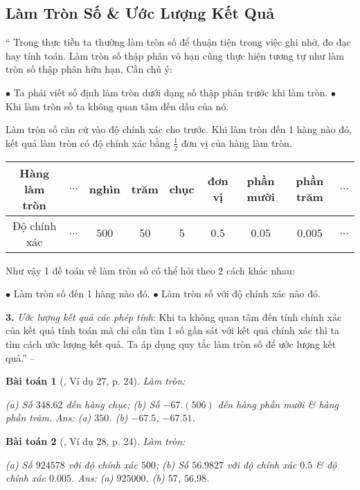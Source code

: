 \documentclass{article}
\newtheorem{baitoan}{Bài toán}
\begin{document}
\subsection{Làm Tròn Số \& Ước Lượng Kết Quả}
``
	 Trong thực tiễn ta thường làm tròn số để thuận tiện trong việc ghi nhớ, đo đạc hay tính toán. Làm tròn số thập phân vô hạn cũng thực hiện tương tự như làm tròn số thập phân hữu hạn. Cần chú ý:
	
		$\bullet$ Ta phải viết số định làm tròn dưới dạng số thập phân trước khi làm tròn.
		$\bullet$ Khi làm tròn số ta không quan tâm đến dấu của nó.
	
	 Làm tròn số căn cứ vào độ chính xác cho trước. Khi làm tròn đến 1 hàng nào đó, kết quả làm tròn có độ chính xác bằng $\frac{1}{2}$ đơn vị của hàng làm tròn.

\begin{table}[H]
	\centering
	\begin{tabular}{|c|c|c|c|c|c|c|c|c|}
		\hline
		Hàng làm tròn & $\ldots$ & nghìn & trăm & chục & đơn vị & phần mười & phần trăm & $\ldots$ \\
		\hline
		Độ chính xác & $\ldots$ & $500$ & $50$ & $5$ & $0.5$ & $0.05$ & $0.005$ & $\ldots$ \\
		\hline
	\end{tabular}
\end{table}
Như vậy 1 đề toán về làm tròn số có thể hỏi theo 2 cách khác nhau:

	$\bullet$ Làm tròn số đến 1 hàng nào đó.
	$\bullet$ Làm tròn số với độ chính xác nào đó.

\textbf{3.} \textit{Ước lượng kết quả các phép tính}: Khi ta không quan tâm đến tính chính xác của kết quả tính toán mà chỉ cần tìm 1 số gần sát với kết quả chính xác thì ta tìm cách ước lượng kết quả. Ta áp dụng quy tắc làm tròn số để ước lượng kết quả.'' -- \cite[Chap. 2, \S4, pp. 23--24]{Tuyen_Toan_7}

\begin{baitoan}[\cite{Tuyen_Toan_7}, Ví dụ 27, p. 24]
	Làm tròn:
	
		(a) Số $348.62$ đến hàng chục;
		(b) Số $-67.(506)$ đến hàng phần mười \& hàng phần trăm.
	\hfill{\sf Ans:} (a) $350$. (b) $-67.5$, $-67.51$.
\end{baitoan}

\begin{baitoan}[\cite{Tuyen_Toan_7}, Ví dụ 28, p. 24]
	Làm tròn:
	
		(a) Số $924578$ với độ chính xác $500$;
		(b) Số $56.9827$ với độ chính xác $0.5$ \& độ chính xác $0.005$.
	\hfill{\sf Ans:} (a) $925000$. (b) $57$, $56.98$.
\end{baitoan}
\end{document}
